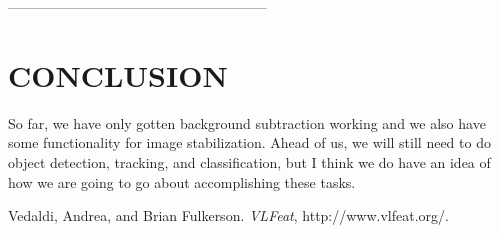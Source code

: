 \documentclass[a4paper, 10pt, conference]{ieeeconf}      %
\begin{document}
--------------------------------------------------------





\section{CONCLUSION}
So far, we have only gotten background subtraction working and we also have some functionality for image stabilization. Ahead of us, we will still need to do object detection, tracking, and classification, but I think we do have an idea of how we are going to go about accomplishing these tasks. 













\begin{thebibliography}{99}

Vedaldi, Andrea, and Brian Fulkerson. {\it VLFeat}, http://www.vlfeat.org/.



\end{thebibliography}
\end{document}
